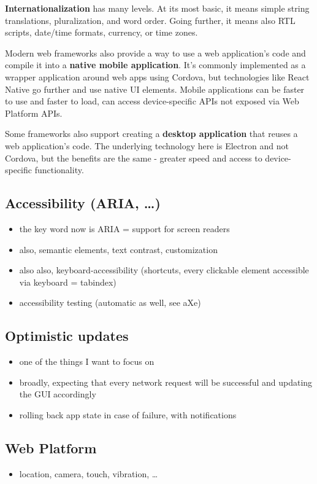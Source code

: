 \documentclass[english,odsaz]{fitthesis}
\begin{document}
\textbf{Internationalization} has many levels. At its most basic, it means simple string
translations, pluralization, and word order. Going further, it means also RTL
scripts, date/time formats, currency, or time zones.

Modern web frameworks also provide a way to use a web application's code and
compile it into a \textbf{native mobile application}. It's commonly implemented as a
wrapper application around web apps using Cordova, but technologies like React
Native go further and use native UI elements. Mobile applications can be faster
to use and faster to load, can access device-specific APIs not exposed via Web
Platform APIs.

Some frameworks also support creating a \textbf{desktop application} that reuses a web
application's code. The underlying technology here is Electron and not Cordova,
but the benefits are the same - greater speed and access to device-specific
functionality.

\subsection{Accessibility (ARIA, \ldots{})}
\label{sec:orga623315}
\begin{itemize}
\item the key word now is ARIA = support for screen readers
\item also, semantic elements, text contrast, customization
\item also also, keyboard-accessibility (shortcuts, every clickable element
accessible via keyboard = tabindex)
\item accessibility testing (automatic as well, see aXe)
\end{itemize}

\subsection{Optimistic updates}
\label{sec:org8219bbf}
\begin{itemize}
\item one of the things I want to focus on
\item broadly, expecting that every network request will be successful and updating
the GUI accordingly
\item rolling back app state in case of failure, with notifications
\end{itemize}

\subsection{Web Platform}
\label{sec:orgc643ea8}
\begin{itemize}
\item location, camera, touch, vibration, \ldots{}
\end{itemize}
\end{document}
